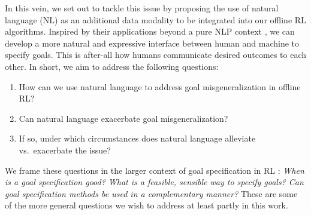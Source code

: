 \documentclass[../thesis-proposal/main.tex]{subfiles}
\begin{document}
In this vein, we set out to tackle this issue by proposing the use of natural language (NL) as an
additional data modality to be integrated into our offline RL algorithms. Inspired by their
applications beyond a pure NLP context \citep{dosovitskiy_image_2022, ramesh_hierarchical_2022,
rombach_high-resolution_2022}, we can develop a more natural and expressive interface between human
and machine to specify goals. This is after-all how humans communicate desired outcomes to each
other. In short, we aim to address the following questions:

\newpage
\begin{enumerate}
  \item How can we use natural language to address goal misgeneralization in offline RL? 
  \item Can natural language exacerbate goal misgeneralization?
  \item If so, under which circumstances does natural language alleviate vs.~exacerbate the issue?
\end{enumerate}

We frame these questions in the larger context of goal specification in RL
\citep{white_unifying_2017, liu_goal-conditioned_2022, bansal_specification-guided_2022}:
\textit{When is a goal specification good? What is a feasible, sensible way to specify goals? Can
goal specification methods be used in a complementary manner?} These are some of the more general
questions we wish to address at least partly in this work.

\ifSubfilesClassLoaded{%
  
}{}
\end{document}
